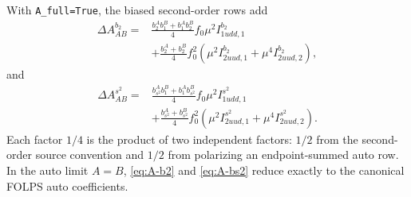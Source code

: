 \documentclass[11pt]{article}
\newcommand{\bsst}{b_{s^2}}
\begin{document}
With \texttt{A\_full=True}, the biased second-order rows add
\begin{align}
\Delta A_{AB}^{b_2}
={}&
\frac{b_2^A b_1^B+b_1^A b_2^B}{4}
f_0\mu^2I_{1udd,1}^{b_2}
\nonumber\\
&+
\frac{b_2^A+b_2^B}{4}f_0^2
\left(
\mu^2I_{2uud,1}^{b_2}
+\mu^4I_{2uud,2}^{b_2}
\right),
\label{eq:A-b2}
\end{align}
and
\begin{align}
\Delta A_{AB}^{s^2}
={}&
\frac{\bsst^A b_1^B+b_1^A \bsst^B}{4}
f_0\mu^2I_{1udd,1}^{s^2}
\nonumber\\
&+
\frac{\bsst^A+\bsst^B}{4}f_0^2
\left(
\mu^2I_{2uud,1}^{s^2}
+\mu^4I_{2uud,2}^{s^2}
\right).
\label{eq:A-bs2}
\end{align}
Each factor $1/4$ is the product of two independent factors: $1/2$ from the
second-order source convention and $1/2$ from polarizing an endpoint-summed
auto row.  In the auto limit $A=B$, \eqref{eq:A-b2} and \eqref{eq:A-bs2}
reduce exactly to the canonical FOLPS auto coefficients.
\end{document}
